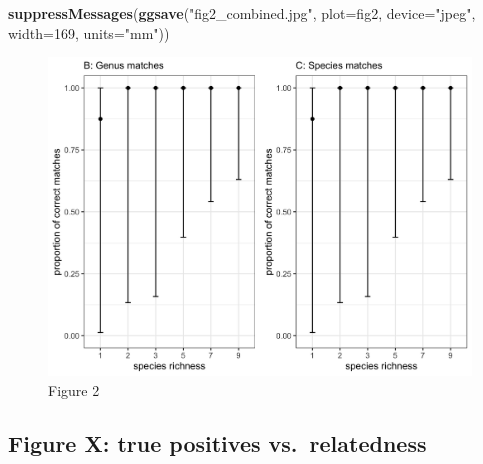 \documentclass[
]{article}
\newenvironment{Shaded}{\begin{snugshade}}{\end{snugshade}}
\newcommand{\DataTypeTok}[1]{\textcolor[rgb]{0.13,0.29,0.53}{#1}}
\newcommand{\DecValTok}[1]{\textcolor[rgb]{0.00,0.00,0.81}{#1}}
\newcommand{\KeywordTok}[1]{\textcolor[rgb]{0.13,0.29,0.53}{\textbf{#1}}}
\newcommand{\NormalTok}[1]{#1}
\newcommand{\StringTok}[1]{\textcolor[rgb]{0.31,0.60,0.02}{#1}}
\begin{document}
\begin{Shaded}
\begin{Highlighting}[]
\KeywordTok{suppressMessages}\NormalTok{(}\KeywordTok{ggsave}\NormalTok{(}\StringTok{"fig2_combined.jpg"}\NormalTok{, }\DataTypeTok{plot=}\NormalTok{fig2, }\DataTypeTok{device=}\StringTok{"jpeg"}\NormalTok{, }\DataTypeTok{width=}\DecValTok{169}\NormalTok{, }\DataTypeTok{units=}\StringTok{"mm"}\NormalTok{))}
\end{Highlighting}
\end{Shaded}

\begin{figure}
\centering
\includegraphics{fig2_combined.jpg}
\caption{Figure 2}
\end{figure}

\hypertarget{figure-x-true-positives-vs.-relatedness}{%
\subsection{Figure X: true positives
vs.~relatedness}\label{figure-x-true-positives-vs.-relatedness}}
\end{document}

